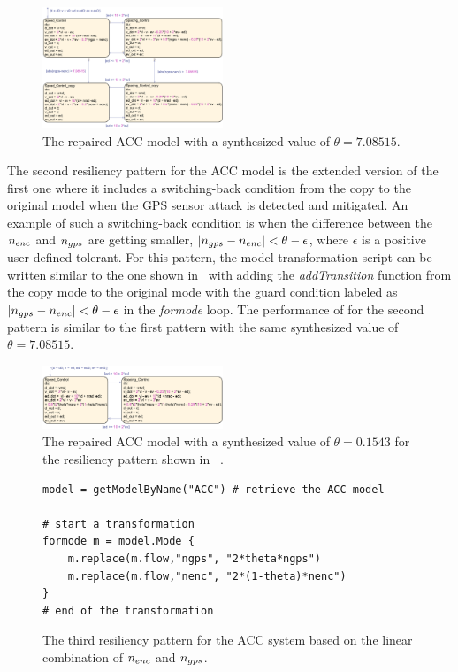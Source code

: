 \begin{figure}[t!]%
	\centering%
    \includegraphics[width=0.48\textwidth]{image/acc_model_pat1}%
	\caption{The repaired ACC model with a synthesized value of $\theta = 7.08515$.}%
\end{figure}%

The second resiliency pattern for the ACC model is the extended version of the first one where it includes a switching-back condition from the copy to the original model when the GPS sensor attack is detected and mitigated. An example of such a switching-back condition is when the difference between the $n_{enc}$ and $n_{gps}$ are getting smaller, \ie $|n_{gps} -n_{enc}| < \theta - \epsilon$, where $\epsilon$ is a positive user-defined tolerant. For this pattern, the model transformation script can be written similar to the one shown in~ with adding the \emph{addTransition} function from the copy mode to the original mode with the guard condition labeled as $|n_{gps} -n_{enc}| < \theta - \epsilon$ in the \emph{formode} loop.
%
The performance of \toolreaffirm for the second pattern is similar to the first pattern with the same synthesized value of $\theta = 7.08515$.

\begin{figure}[t!]%
	\centering%
    \includegraphics[width=0.48\textwidth]{image/acc_model_pat3}%
	\caption{The repaired ACC model with a synthesized value of $\theta = 0.1543$ for the resiliency pattern shown in ~.}%
\end{figure}%
%
\begin{figure}[tbp]%
\begin{lstlisting}[basicstyle=\ttfamily\footnotesize, numbers=none]
model = getModelByName("ACC") # retrieve the ACC model

# start a transformation  
formode m = model.Mode {
    m.replace(m.flow,"ngps", "2*theta*ngps")
    m.replace(m.flow,"nenc", "2*(1-theta)*nenc")
}
# end of the transformation
\end{lstlisting}
\caption{The third resiliency pattern for the ACC system based on the linear combination of $n_{enc}$ and $n_{gps}$.}%
%
\end{figure}



